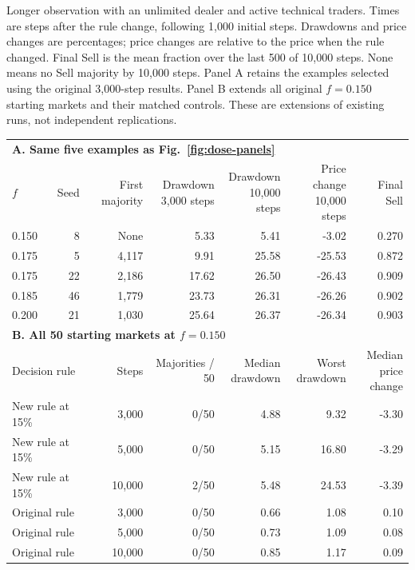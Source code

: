 \begin{center}
\begin{minipage}{\linewidth}\centering
\captionsetup{type=table,hypcap=false}
\caption{Longer observation with an unlimited dealer and active technical traders. Times are steps after the rule change, following 1,000 initial steps. Drawdowns and price changes are percentages; price changes are relative to the price when the rule changed. Final Sell is the mean fraction over the last 500 of 10,000 steps. None means no Sell majority by 10,000 steps. Panel A retains the examples selected using the original 3,000-step results. Panel B extends all original $f=0.150$ starting markets and their matched controls. These are extensions of existing runs, not independent replications.}
\label{tab:market-panel-horizons}
\footnotesize\setlength{\tabcolsep}{2.5pt}
\begin{tabular}{lrrrrrr}
\toprule
\multicolumn{7}{l}{\textbf{A. Same five examples as Fig.~\ref{fig:dose-panels}}} \\
$f$ & Seed & First majority & \shortstack{Drawdown\\3,000 steps} & \shortstack{Drawdown\\10,000 steps} & \shortstack{Price change\\10,000 steps} & Final Sell \\
0.150 & 8 & None & 5.33 & 5.41 & -3.02 & 0.270 \\
0.175 & 5 & 4,117 & 9.91 & 25.58 & -25.53 & 0.872 \\
0.175 & 22 & 2,186 & 17.62 & 26.50 & -26.43 & 0.909 \\
0.185 & 46 & 1,779 & 23.73 & 26.31 & -26.26 & 0.902 \\
0.200 & 21 & 1,030 & 25.64 & 26.37 & -26.34 & 0.903 \\
\midrule
\multicolumn{7}{l}{\textbf{B. All 50 starting markets at $f=0.150$}} \\
\multicolumn{2}{l}{Decision rule} & Steps & Majorities / 50 & \shortstack{Median\\drawdown} & \shortstack{Worst\\drawdown} & \shortstack{Median\\price change} \\
\multicolumn{2}{l}{New rule at 15\%} & 3,000 & 0/50 & 4.88 & 9.32 & -3.30 \\
\multicolumn{2}{l}{New rule at 15\%} & 5,000 & 0/50 & 5.15 & 16.80 & -3.29 \\
\multicolumn{2}{l}{New rule at 15\%} & 10,000 & 2/50 & 5.48 & 24.53 & -3.39 \\
\multicolumn{2}{l}{Original rule} & 3,000 & 0/50 & 0.66 & 1.08 & 0.10 \\
\multicolumn{2}{l}{Original rule} & 5,000 & 0/50 & 0.73 & 1.09 & 0.08 \\
\multicolumn{2}{l}{Original rule} & 10,000 & 0/50 & 0.85 & 1.17 & 0.09 \\
\bottomrule
\end{tabular}
\end{minipage}
\end{center}

